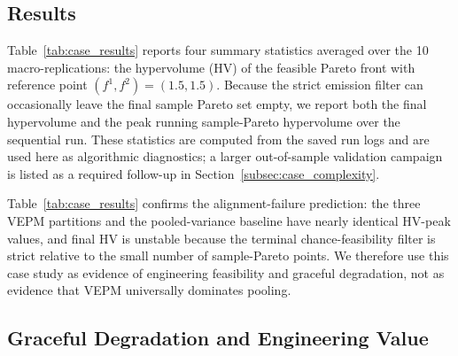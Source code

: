 \documentclass[12pt]{article}
\theoremstyle{plain}
\theoremstyle{definition}
\theoremstyle{remark}
\begin{document}
\subsection{Results}\label{subsec:case_results}

Table~\ref{tab:case_results} reports four summary statistics averaged
over the 10 macro-replications: the hypervolume (HV) of the feasible
Pareto front with reference point $(f^{1},f^{2})=(1.5,1.5)$.  Because
the strict emission filter can occasionally leave the final sample
Pareto set empty, we report both the final hypervolume and the peak
running sample-Pareto hypervolume over the sequential run.  These
statistics are computed from the saved run logs and are used here as
algorithmic diagnostics; a larger out-of-sample validation campaign is
listed as a required follow-up in Section~\ref{subsec:case_complexity}.

\begin{table}[t]
\centering
\caption{RESCO ingolstadt21 algorithmic diagnostics, averaged over
10 macro-replications with seeds $\{100,200,\ldots,1000\}$.
All runs use $d=44$, $N=300$, $n_0=100$, $\tau=1.0$, and
$\alpha=0.05$.  HV uses reference point $(1.5,1.5)$.  HV-peak is the
maximum running sample-Pareto hypervolume; HV-final is the corresponding
value at the final iteration.  The table is generated from the saved
JSON logs by
\texttt{experiments.ingolstadt21.summarize\_case\_study}.}
\label{tab:case_results}
\small

\end{table}

Table~\ref{tab:case_results} confirms the alignment-failure prediction:
the three VEPM partitions and the pooled-variance baseline have nearly
identical HV-peak values, and final HV is unstable because the terminal
chance-feasibility filter is strict relative to the small number of
sample-Pareto points.  We therefore use this case study as evidence of
engineering feasibility and graceful degradation, not as evidence that
VEPM universally dominates pooling.


\subsection{Graceful Degradation and Engineering Value}\label{subsec:case_vepm}
\end{document}
